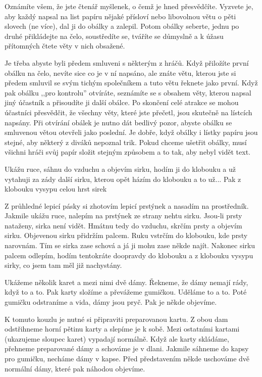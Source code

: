 Oznámíte všem, že jste čtenář myšlenek, o čemž je hned 
přesvědčíte. Vyzvete je, aby každý napsal na list papíru nějaké 
přísloví nebo libovolnou větu o pěti slovech (ne více), dal ji 
do obálky a zalepil. Potom obálky seberte, jednu po druhé přikládejte 
na čelo, soustředíte se, tváříte se důmyslně a k úžasu přítomných 
čtete věty v nich obsažené.

Je třeba abyste byli předem smluveni s některým z hráčů. 
Když přiložíte první obálku na čelo, nevíte sice co je v ní napsáno, 
ale znáte větu, kterou jste si předem smluvil se svým tichým 
společníkem a tuto větu řeknete jako první. Když pak obálku ,,pro 
kontrolu'' otvíráte, seznámíte se s obsahem věty, kterou 
napsal jiný účastník a přisoudíte ji další obálce. Po skončení 
celé atrakce se mohou účastníci přesvědčit, že všechny věty, 
které jste přečetl, jsou skutečně na lístcích napsány. Při otvírání 
obálek je nutno dát bedlivý pozor, abyste obálku se smluvenou 
větou otevřeli jako poslední. Je dobře, když obálky i lístky 
papíru jsou stejné, aby některý z diváků nepoznal trik. Pokud 
chceme ušetřit obálky, musí všichni hráči svůj papír složit stejným 
způsobem a to tak, aby nebyl vidět text.


Ukážu ruce, sáhnu do vzduchu a objevím sirku, hodím 
ji do klobouku a už vytahuji za zády další sirku, kterou opět 
házím do klobouku a to už... Pak z klobouku vysypu celou hrst 
sirek

Z průhledné lepicí pásky si zhotovím lepicí prstýnek a nasadím 
na prostředník. Jakmile ukážu ruce, nalepím na prstýnek ze strany 
nehtu sirku. Jsou-li prsty nataženy, sirka není vidět. Hmátnu 
tedy do vzduchu, skrčím prsty a objevím sirku. Objevenou sirku 
přidržím palcem. Ruku vstrčím do klobouku, kde prsty narovnám. 
Tím se sirka zase schová a já ji mohu zase někde najít. Nakonec 
sirku palcem odlepím, hodím tentokráte doopravdy do klobouku 
a z klobouku vysypu sirky, co jsem tam měl již nachystány.


Ukážeme několik karet a mezi nimi dvě dámy. Řekneme, 
že dámy nemají rády, když to a to. Pak karty složíme a převážeme 
gumičkou. Uděláme to a to. Poté gumičku odstraníme a vida, dámy 
jsou pryč. Pak je někde objevíme.

K tomuto kouzlu je nutné si připraviti preparovanou kartu. 
Z obou dam odstřihneme horní pětinu karty a slepíme je k sobě. 
Mezi ostatními kartami (ukazujeme sloupec karet) vypadají normálně. 
Když ale karty skládáme, přehneme preparované dámy a schováme 
je v dlani. Jakmile sáhneme do kapsy pro gumičku, necháme dámy 
v kapse. Před představením někde uschováme dvě normální dámy, 
které pak náhodou objevíme.



